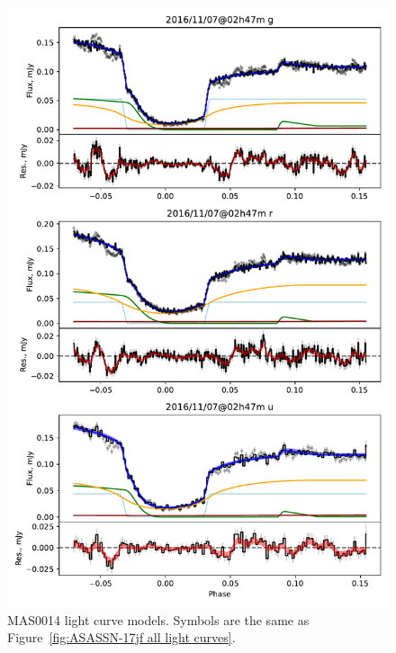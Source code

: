 %     

\begin{figure}
    \centering
    \includegraphics[width=\textwidth]{figures/results/MASOT0014/MASOT0014_1.pdf}
    \caption{MAS0014 light curve models. Symbols are the same as Figure~\ref{fig:ASASSN-17jf all light curves}.}
    \label{fig:MAS0014 all light curves}
\end{figure}
